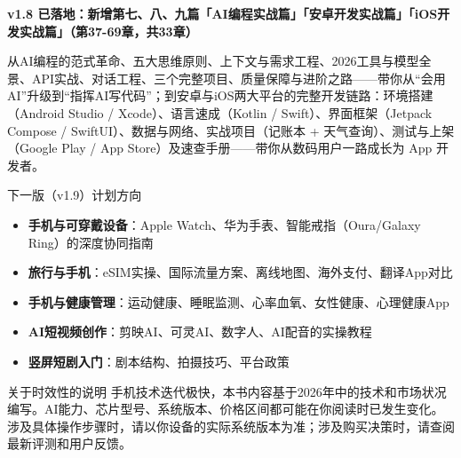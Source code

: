 

\textbf{v1.8 已落地：新增第七、八、九篇「AI编程实战篇」「安卓开发实战篇」「iOS开发实战篇」（第37-69章，共33章）}\par

从AI编程的范式革命、五大思维原则、上下文与需求工程、2026工具与模型全景、API实战、对话工程、三个完整项目、质量保障与进阶之路——带你从“会用AI”升级到“指挥AI写代码”；到安卓与iOS两大平台的完整开发链路：环境搭建（Android Studio / Xcode）、语言速成（Kotlin / Swift）、界面框架（Jetpack Compose / SwiftUI）、数据与网络、实战项目（记账本 + 天气查询）、测试与上架（Google Play / App Store）及速查手册——带你从数码用户一路成长为 App 开发者。

\begin{tcbinfo}{下一版（v1.9）计划方向}
\begin{itemize}
  \item \textbf{手机与可穿戴设备}：Apple Watch、华为手表、智能戒指（Oura/Galaxy Ring）的深度协同指南
  \item \textbf{旅行与手机}：eSIM实操、国际流量方案、离线地图、海外支付、翻译App对比
  \item \textbf{手机与健康管理}：运动健康、睡眠监测、心率血氧、女性健康、心理健康App
  \item \textbf{AI短视频创作}：剪映AI、可灵AI、数字人、AI配音的实操教程
  \item \textbf{竖屏短剧入门}：剧本结构、拍摄技巧、平台政策
\end{itemize}

\end{tcbinfo}

\begin{tcbwarn}{关于时效性的说明}
手机技术迭代极快，本书内容基于2026年中的技术和市场状况编写。AI能力、芯片型号、系统版本、价格区间都可能在你阅读时已发生变化。涉及具体操作步骤时，请以你设备的实际系统版本为准；涉及购买决策时，请查阅最新评测和用户反馈。

\end{tcbwarn}

